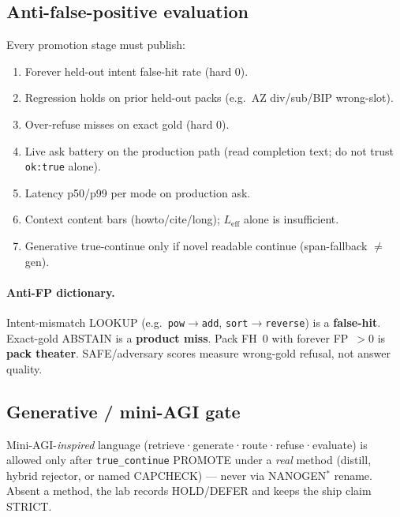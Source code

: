 \subsection{Anti-false-positive evaluation}
Every promotion stage must publish:
\begin{enumerate}
  \item Forever held-out intent false-hit rate (hard 0).
  \item Regression holds on prior held-out packs (e.g.\ AZ div/sub/BIP wrong-slot).
  \item Over-refuse misses on exact gold (hard 0).
  \item Live ask battery on the production path (read completion text; do not trust
        \texttt{ok:true} alone).
  \item Latency p50/p99 per mode on production ask.
  \item Context content bars (howto/cite/long); $L_{\mathrm{eff}}$ alone is insufficient.
  \item Generative true-continue only if novel readable continue (span-fallback $\neq$ gen).
\end{enumerate}

\paragraph{Anti-FP dictionary.}
Intent-mismatch LOOKUP (e.g.\ \texttt{pow}$\rightarrow$\texttt{add},
\texttt{sort}$\rightarrow$\texttt{reverse}) is a \textbf{false-hit}.
Exact-gold ABSTAIN is a \textbf{product miss}.
Pack FH~$0$ with forever FP~$>0$ is \textbf{pack theater}.
SAFE/adversary scores measure wrong-gold refusal, not answer quality.

\subsection{Generative / mini-AGI gate}
Mini-AGI-\emph{inspired} language (retrieve·generate·route·refuse·evaluate) is
allowed only after \texttt{true\_continue} PROMOTE under a \emph{real} method
(distill, hybrid rejector, or named CAPCHECK) --- never via NANOGEN$^*$ rename.
Absent a method, the lab records HOLD/DEFER and keeps the ship claim STRICT.
